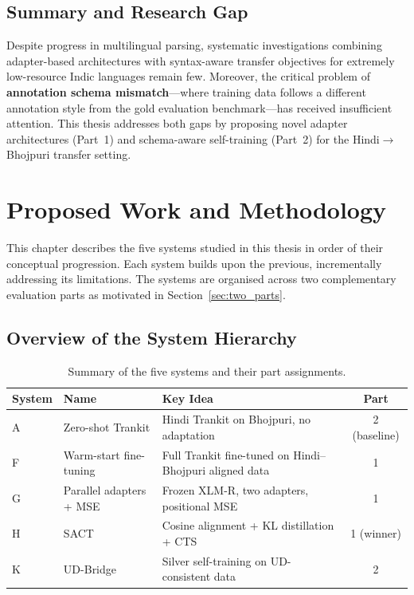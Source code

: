 \documentclass[12pt,a4paper,oneside]{report}
\begin{document}
\section{Summary and Research Gap}

Despite progress in multilingual parsing, systematic investigations combining
adapter-based architectures with syntax-aware transfer objectives for extremely
low-resource Indic languages remain few. Moreover, the critical problem of
\textbf{annotation schema mismatch}---where training data follows a different
annotation style from the gold evaluation benchmark---has received insufficient
attention. This thesis addresses both gaps by proposing novel adapter architectures
(Part~1) and schema-aware self-training (Part~2) for the
Hindi$\to$Bhojpuri transfer setting.


\chapter{Proposed Work and Methodology}
\label{chap:method}

This chapter describes the five systems studied in this thesis in order of their
conceptual progression. Each system builds upon the previous, incrementally
addressing its limitations. The systems are organised across two complementary
evaluation parts as motivated in Section~\ref{sec:two_parts}.

\section{Overview of the System Hierarchy}

\begin{table}[ht]
\centering
\caption{Summary of the five systems and their part assignments.}
\label{tab:systems_overview}
\begin{tabular}{@{}lllc@{}}
\toprule
\textbf{System} & \textbf{Name} & \textbf{Key Idea} & \textbf{Part} \\
\midrule
A & Zero-shot Trankit       & Hindi Trankit on Bhojpuri, no adaptation      & 2 (baseline) \\
F & Warm-start fine-tuning  & Full Trankit fine-tuned on Hindi--Bhojpuri aligned data    & 1 \\
G & Parallel adapters + MSE & Frozen XLM-R, two adapters, positional MSE     & 1 \\
H & SACT                    & Cosine alignment + KL distillation + CTS       & 1 (winner) \\
K & UD-Bridge               & Silver self-training on UD-consistent data      & 2 \\
\bottomrule
\end{tabular}
\end{table}
\end{document}
